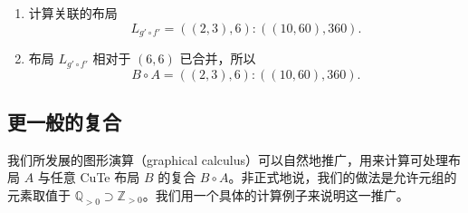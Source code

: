 \begin{example}
\begin{enumerate}
\[\begin{tikzcd} [row sep = 1, column sep = 8]
        & & 6 \ar[uuuurr,mapsto]& & 2 \\
        6 \ar[rru,-]& &  3 \ar[uuurr,mapsto] & & 5 \\
        6  \ar[rr,-] \ar[urr,-] & &  2 \ar[uurr,mapsto] & & 2 \\
        & &  & \mathclap{g '\circ f'} &
        \end{tikzcd} \]
        \item 计算关联的布局
        \[
        L_{g' \circ f'} = ((2,3),6):((10,60),360).
        \]
        \item 布局 $L_{g' \circ f'}$ 相对于 $(6,6)$ 已合并，所以
        \[
        B \circ A = ((2,3),6):((10,60),360).
        \]
    \end{enumerate}
\end{example}

\subsection{更一般的复合}

我们所发展的图形演算（graphical calculus）可以自然地推广，用来计算可处理布局 $A$ 与任意 CuTe 布局 $B$ 的复合 $B \circ A$。非正式地说，我们的做法是允许元组的元素取值于 $\mathbb{Q}_{>0} \supset \mathbb{Z}_{>0}$。我们用一个具体的计算例子来说明这一推广。

